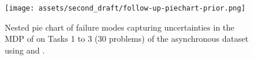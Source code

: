\begin{figure}[t!]
    \centering
    \texttt{[image: assets/second\_draft/follow-up-piechart-prior.png]}
    \caption{Nested pie chart of failure modes capturing uncertainties in the MDP of \gptfo{} \reactp{} on Tasks 1 to 3 (30 problems) of the asynchronous dataset using \gptfo{} \react{} and \gptfo{} \reactp{}.}
    \label{fig:piechart_followup}
\end{figure}